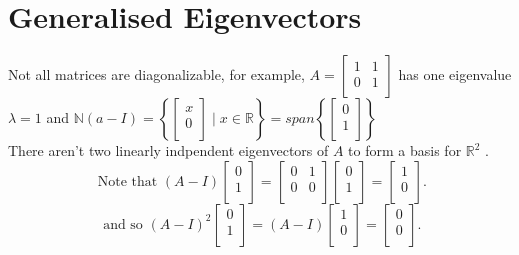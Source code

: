 \documentclass{report}
\begin{document}
 \section{Generalised Eigenvectors}
 Not all matrices are diagonalizable, for example, $ A = \begin{bmatrix}
 1 & 1\\
 0 & 1\\
\end{bmatrix}$ has one eigenvalue  $ \lambda =1$ and $ \mathbb{N} \left(  a - I \right) = \left\{ \begin{bmatrix}
x\\
0\\
\end{bmatrix}
\mid x \in \mathbb{R}  \right\} = span \left\{  \begin{bmatrix}
0\\
1\\
\end{bmatrix}
 \right\} $
 \\
 There aren't two linearly indpendent eigenvectors of $ A$ to form a basis for $ \mathbb{R} ^2 $ .\\
 \[
 \text{ Note that }      \left( A - I \right)  \begin{bmatrix}
 0\\
 1\\
 \end{bmatrix}
 = \begin{bmatrix}
 0 & 1\\
 0 & 0\\
 \end{bmatrix} \begin{bmatrix}
 0\\
 1\\
 \end{bmatrix}
 = \begin{bmatrix}
 1\\
 0\\
 \end{bmatrix}
 .\] 
  \[
  \text{ and so } \left( A - I \right) ^2     \begin{bmatrix}
  0\\
  1\\
  \end{bmatrix}
  = \left(  A -I \right)  \begin{bmatrix}
  1\\
  0\\
  \end{bmatrix}
   = \begin{bmatrix}
   0\\
   0\\
   \end{bmatrix}
  .\] 
\end{document}
